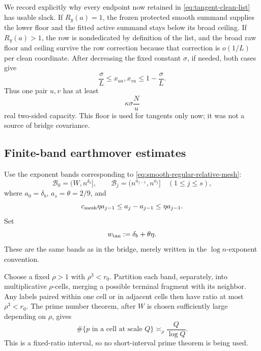 \documentclass[11pt]{article}
\numberwithin{equation}{section}
\theoremstyle{definition}
\theoremstyle{remark}
\newcommand{\1}{\mathbf 1}
\begin{document}
We record explicitly why every endpoint now retained in
\eqref{eq:tangent-clean-list} has usable slack.  If \(R_y(a)=1\), the
frozen protected smooth summand supplies the lower floor and the fitted
active summand stays below its broad ceiling.  If \(R_y(a)>1\), the row is
nondedicated by definition of the list, and the broad raw floor and ceiling
survive the row correction because that correction is \(o(1/L)\) per clean
coordinate.  After decreasing the fixed constant \(\sigma\), if needed,
both cases give
\begin{equation}
                 \frac{\sigma}{L}\leq x_{ua},x_{va}
                 \leq1-\frac{\sigma}{L}.
\label{eq:tangent-endpoint-slack}
\end{equation}
Thus one pair \(u,v\) has at least
\begin{equation}
                         \kappa\sigma\frac{N}{u}
\label{eq:tangent-pair-capacity}
\end{equation}
real two-sided capacity.  This floor is used for tangents only now; it
was not a source of bridge covariance.

\subsection{Finite-band earthmover estimates}
\label{subsec:tangent-earthmover}

Use the exponent bands corresponding to
\eqref{eq:smooth-regular-relative-mesh}:
\begin{equation}
 \mathcal B_0=(W,n^{\delta_b}],\qquad
 \mathcal B_j=(n^{a_{j-1}},n^{a_j}]
       \quad(1\leq j\leq s),
\label{eq:tangent-exponent-bands}
\end{equation}
where \(a_0=\delta_b\), \(a_s=\theta=2/9\), and
\[
 c_{\rm mesh}\eta a_{j-1}\leq a_j-a_{j-1}
       \leq\eta a_{j-1}.
\]
Set
\begin{equation}
                         w_{\rm tan}:=\delta_b+\theta\eta.
\label{eq:tangent-width}
\end{equation}
These are the same bands as in the bridge, merely written in the
\(\log n\)-exponent convention.

Choose a fixed \(\rho>1\) with \(\rho^3<r_0\).  Partition each band,
separately, into multiplicative \(\rho\)-cells, merging a possible
terminal fragment with its neighbor.  Any labels paired within one cell
or in adjacent cells then have ratio at most \(\rho^3<r_0\).
The prime number theorem, after \(W\) is chosen sufficiently large
depending on \(\rho\), gives
\begin{equation}
 \#\{p\text{ in a cell at scale }Q\}
                         \asymp_\rho\frac{Q}{\log Q}.
\label{eq:tangent-cell-prime-count}
\end{equation}
This is a fixed-ratio interval, so no short-interval prime theorem is
being used.
\end{document}
